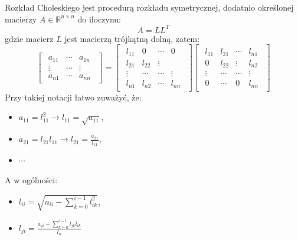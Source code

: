 \documentclass{article}
\begin{document}
\begin{enumerate}
    Rozkład Choleskiego jest procedurą rozkładu symetrycznej, dodatnio określonej macierzy $A \in \mathbb{R}^{n \times n}$ do iloczynu:
    $$
        A = LL^{T}
    $$
    gdzie macierz $L$ jest macierzą trójkątną dolną, zatem:
    $$
        \begin{bmatrix}\begin{array}{rrr} a_{11} & \cdots & a_{1n}\\ \vdots & \cdots & \vdots \\ a_{n1} & \cdots & a_{nn} \end{array}\end{bmatrix}
        =
        \begin{bmatrix}\begin{array}{rrrr} l_{11} & 0 & \cdots & 0\\ l_{21} & l_{22} & \vdots \\ \vdots & \cdots & \cdots & \vdots \\ l_{n1} & l_{n2} & \cdots & l_{nn} \end{array}\end{bmatrix}
        \begin{bmatrix}\begin{array}{rrrr} l_{11} & l_{21} & \cdots & l_{n1}\\ 0 & l_{22} & \vdots & l_{n2}\\ \vdots & \cdots & \cdots & \vdots \\ 0 & \cdots & 0 & l_{nn} \end{array}\end{bmatrix}
    $$
    Przy takiej notacji łatwo zuważyć, że:
    \begin{itemize}
        \item $a_{11} = l_{11}^{2} \rightarrow l_{11}=\sqrt{a_{11}}$,
        \item $a_{21} = l_{21}l_{11} \rightarrow l_{21} = \frac{a_{21}}{l_{11}}$,
        \item $\cdots$
    \end{itemize}
    A w ogólności:
    \begin{itemize}
        \item $l_{ii} = \sqrt{a_{ii} - \sum_{k=0}^{i-1}{l_{ik}^{2}}}$,
        \item $l_{ji} = \frac{a_{ji} - \sum_{k=0}^{i-1}{l_{jk}l_{ik}}}{l_{ii}}$
    \end{itemize}


\end{enumerate}
\end{document}
